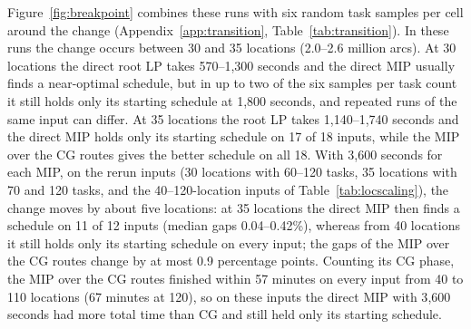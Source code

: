 Figure~\ref{fig:breakpoint} combines these runs with six random task samples per cell around the change (Appendix~\ref{app:transition}, Table~\ref{tab:transition}).
In these runs the change occurs between 30 and 35 locations (2.0--2.6 million arcs).
At 30 locations the direct root LP takes 570--1{,}300 seconds and the direct MIP usually finds a near-optimal schedule, but in up to two of the six samples per task count it still holds only its starting schedule at 1{,}800 seconds, and repeated runs of the same input can differ.
At 35 locations the root LP takes 1{,}140--1{,}740 seconds and the direct MIP holds only its starting schedule on 17 of 18 inputs, while the MIP over the CG routes gives the better schedule on all 18.
With 3{,}600 seconds for each MIP, on the rerun inputs (30 locations with 60--120 tasks, 35 locations with 70 and 120 tasks, and the 40--120-location inputs of Table~\ref{tab:locscaling}), the change moves by about five locations: at 35 locations the direct MIP then finds a schedule on 11 of 12 inputs (median gaps 0.04--0.42\%), whereas from 40 locations it still holds only its starting schedule on every input; the gaps of the MIP over the CG routes change by at most 0.9 percentage points.
Counting its CG phase, the MIP over the CG routes finished within 57 minutes on every input from 40 to 110 locations (67 minutes at 120), so on these inputs the direct MIP with 3{,}600 seconds had more total time than CG and still held only its starting schedule.
